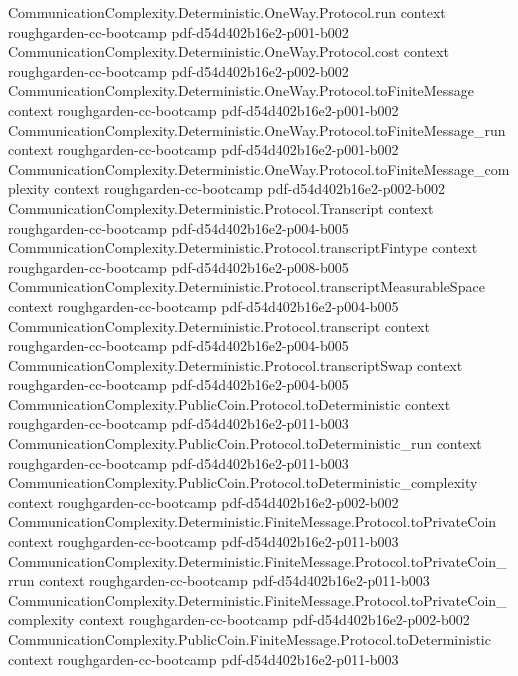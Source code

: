 \begin{theorem}
\proofstep
  {CommunicationComplexity.Deterministic.OneWay.Protocol.run}
  {context}
  {roughgarden-cc-bootcamp}
  {pdf-d54d402b16e2-p001-b002}
\proofstep
  {CommunicationComplexity.Deterministic.OneWay.Protocol.cost}
  {context}
  {roughgarden-cc-bootcamp}
  {pdf-d54d402b16e2-p002-b002}
\proofstep
  {CommunicationComplexity.Deterministic.OneWay.Protocol.toFiniteMessage}
  {context}
  {roughgarden-cc-bootcamp}
  {pdf-d54d402b16e2-p001-b002}
\proofstep
  {CommunicationComplexity.Deterministic.OneWay.Protocol.toFiniteMessage_run}
  {context}
  {roughgarden-cc-bootcamp}
  {pdf-d54d402b16e2-p001-b002}
\proofstep
  {CommunicationComplexity.Deterministic.OneWay.Protocol.toFiniteMessage_complexity}
  {context}
  {roughgarden-cc-bootcamp}
  {pdf-d54d402b16e2-p002-b002}
\proofstep
  {CommunicationComplexity.Deterministic.Protocol.Transcript}
  {context}
  {roughgarden-cc-bootcamp}
  {pdf-d54d402b16e2-p004-b005}
\proofstep
  {CommunicationComplexity.Deterministic.Protocol.transcriptFintype}
  {context}
  {roughgarden-cc-bootcamp}
  {pdf-d54d402b16e2-p008-b005}
\proofstep
  {CommunicationComplexity.Deterministic.Protocol.transcriptMeasurableSpace}
  {context}
  {roughgarden-cc-bootcamp}
  {pdf-d54d402b16e2-p004-b005}
\proofstep
  {CommunicationComplexity.Deterministic.Protocol.transcript}
  {context}
  {roughgarden-cc-bootcamp}
  {pdf-d54d402b16e2-p004-b005}
\proofstep
  {CommunicationComplexity.Deterministic.Protocol.transcriptSwap}
  {context}
  {roughgarden-cc-bootcamp}
  {pdf-d54d402b16e2-p004-b005}
\proofstep
  {CommunicationComplexity.PublicCoin.Protocol.toDeterministic}
  {context}
  {roughgarden-cc-bootcamp}
  {pdf-d54d402b16e2-p011-b003}
\proofstep
  {CommunicationComplexity.PublicCoin.Protocol.toDeterministic_run}
  {context}
  {roughgarden-cc-bootcamp}
  {pdf-d54d402b16e2-p011-b003}
\proofstep
  {CommunicationComplexity.PublicCoin.Protocol.toDeterministic_complexity}
  {context}
  {roughgarden-cc-bootcamp}
  {pdf-d54d402b16e2-p002-b002}
\proofstep
  {CommunicationComplexity.Deterministic.FiniteMessage.Protocol.toPrivateCoin}
  {context}
  {roughgarden-cc-bootcamp}
  {pdf-d54d402b16e2-p011-b003}
\proofstep
  {CommunicationComplexity.Deterministic.FiniteMessage.Protocol.toPrivateCoin_rrun}
  {context}
  {roughgarden-cc-bootcamp}
  {pdf-d54d402b16e2-p011-b003}
\proofstep
  {CommunicationComplexity.Deterministic.FiniteMessage.Protocol.toPrivateCoin_complexity}
  {context}
  {roughgarden-cc-bootcamp}
  {pdf-d54d402b16e2-p002-b002}
\proofstep
  {CommunicationComplexity.PublicCoin.FiniteMessage.Protocol.toDeterministic}
  {context}
  {roughgarden-cc-bootcamp}
  {pdf-d54d402b16e2-p011-b003}

\end{theorem}
